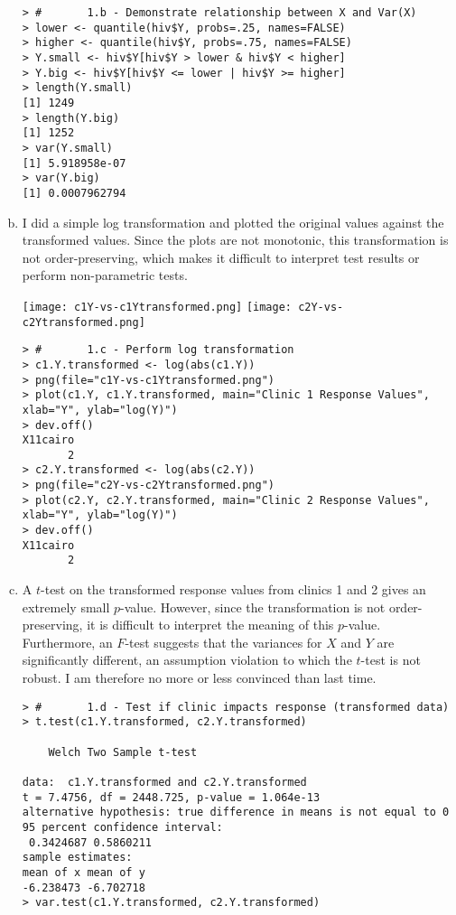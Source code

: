 \documentclass[a4paper, 10pt]{article}
\newcounter{prob_num}
\begin{document}
\begin{enumerate}[(a)]
{\scriptsize \begin{verbatim}
> #       1.b - Demonstrate relationship between X and Var(X)
> lower <- quantile(hiv$Y, probs=.25, names=FALSE)
> higher <- quantile(hiv$Y, probs=.75, names=FALSE)
> Y.small <- hiv$Y[hiv$Y > lower & hiv$Y < higher]
> Y.big <- hiv$Y[hiv$Y <= lower | hiv$Y >= higher]
> length(Y.small)
[1] 1249
> length(Y.big)
[1] 1252
> var(Y.small)
[1] 5.918958e-07
> var(Y.big)
[1] 0.0007962794
\end{verbatim} }

\item I did a simple log transformation and plotted the original values against the transformed values. Since the plots are not monotonic, this transformation is not order-preserving, which makes it difficult to interpret test results or perform non-parametric tests.

\begin{center}
  \texttt{[image: c1Y-vs-c1Ytransformed.png]}
  \texttt{[image: c2Y-vs-c2Ytransformed.png]}
\end{center}

{\scriptsize \begin{verbatim}
> #       1.c - Perform log transformation
> c1.Y.transformed <- log(abs(c1.Y))
> png(file="c1Y-vs-c1Ytransformed.png")
> plot(c1.Y, c1.Y.transformed, main="Clinic 1 Response Values", xlab="Y", ylab="log(Y)")
> dev.off()
X11cairo 
       2 
> c2.Y.transformed <- log(abs(c2.Y))
> png(file="c2Y-vs-c2Ytransformed.png")
> plot(c2.Y, c2.Y.transformed, main="Clinic 2 Response Values", xlab="Y", ylab="log(Y)")
> dev.off()
X11cairo 
       2
\end{verbatim} }

\item A $t$-test on the transformed response values from clinics 1 and 2 gives an extremely small $p$-value. However, since the transformation is not order-preserving, it is difficult to interpret the meaning of this $p$-value. Furthermore, an $F$-test suggests that the variances for $X$ and $Y$ are significantly different, an assumption violation to which the $t$-test is not robust. I am therefore no more or less convinced than last time.
{\scriptsize \begin{verbatim}
> #       1.d - Test if clinic impacts response (transformed data)
> t.test(c1.Y.transformed, c2.Y.transformed)

	Welch Two Sample t-test

data:  c1.Y.transformed and c2.Y.transformed 
t = 7.4756, df = 2448.725, p-value = 1.064e-13
alternative hypothesis: true difference in means is not equal to 0 
95 percent confidence interval:
 0.3424687 0.5860211 
sample estimates:
mean of x mean of y 
-6.238473 -6.702718
> var.test(c1.Y.transformed, c2.Y.transformed)


\end{verbatim}}
\end{enumerate}
\end{document}
